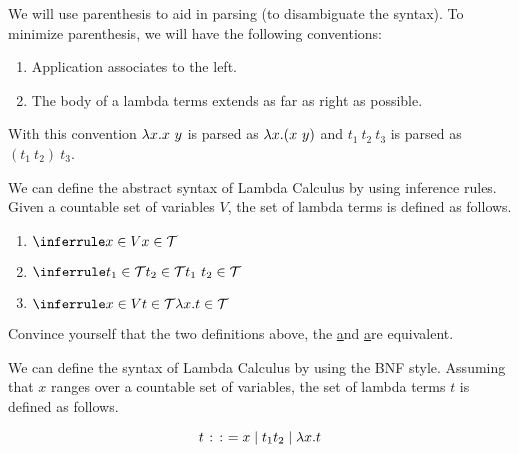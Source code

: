 \begin{gram}
\label{grm:lcs::syn::conventions} 
We will use parenthesis to aid in parsing (to disambiguate the
syntax).  To minimize parenthesis, we will have the following
conventions:
\begin{enumerate}
\item Application associates to the left.
\item The body of a lambda terms extends as far as right as possible. 
\end{enumerate}

With this convention $\lambda x. x~y$ is parsed as $\lambda x. (x~y)$ and $t_1~
t_2~t_3$ is parsed as $(t_1~t_2)~t_3$.
\end{gram}


\begin{definition}
\label{def:lcs::syn::inference}
We can define the abstract syntax of Lambda Calculus by using inference rules.
%
Given a countable set of variables $V$, the set of lambda terms is
defined as follows.

\begin{enumerate}

\item{$\infer {x\in {\cal T}} {x\in V}$}

\item{$\infer  {t_1~t_2\in {\cal T}} {t_1\in {\cal T} \\t_2\in {\cal T}}$}

\item{$\infer  {\l x.t\in {\cal T}} {x\in V \\t\in {\cal T}}$}
\end{enumerate}

\end{definition}

\begin{exercise}
Convince yourself that the two definitions above, 
%
the  \href{def:lcs::syn::inductive} and \href{def:lcs::syn::inference}
%
are equivalent.
\end{exercise}

\begin{definition}
\label{def:lcs::syn::bnf} 
We can define the syntax of Lambda Calculus by using the BNF style. 
%
Assuming that $x$ ranges over a countable set of variables, the set of
lambda terms $t$ is defined as follows.

\[
t \mathrel{\colon\colon\mathord{=}} x \mathrel{\mid} t_1 t_2 \mathrel{\mid} \lambda x.t
\]
\end{definition}



